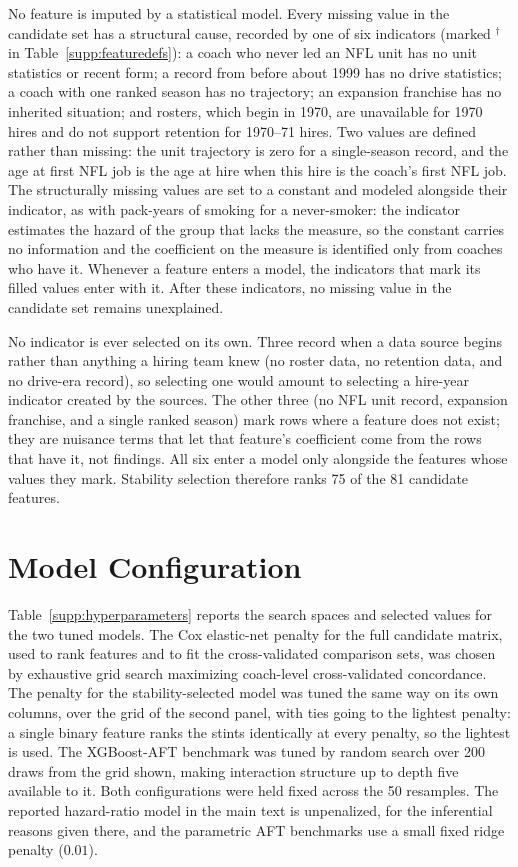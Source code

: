 \documentclass[12pt,USenglish]{article}
\begin{document}
No feature is imputed by a statistical model. Every missing value in the candidate set has a
structural cause, recorded by one of six indicators (marked $^{\dagger}$ in
Table~\ref{supp:featuredefs}): a coach who never led an NFL unit has no unit statistics or
recent form; a record from before about 1999 has no drive statistics; a coach with one ranked
season has no trajectory; an expansion franchise has no inherited situation; and rosters,
which begin in 1970, are unavailable for 1970 hires and do not support retention for 1970--71
hires. Two values are defined rather than missing: the unit trajectory is zero for a
single-season record, and the age at first NFL job is the age at hire when this hire is the
coach's first NFL job. The structurally missing values are set to a constant and modeled
alongside their indicator, as with pack-years of smoking for a never-smoker: the indicator
estimates the hazard of the group that lacks the measure, so the constant carries no
information and the coefficient on the measure is identified only from coaches who have it.
Whenever a feature enters a model, the indicators that mark its filled values enter with it.
After these indicators, no missing value in the candidate set remains unexplained.

No indicator is ever selected on its own. Three record when a data source begins rather
than anything a hiring team knew (no roster data, no retention data, and no drive-era
record), so selecting one would amount to selecting a hire-year indicator created by the
sources. The other three (no NFL unit record, expansion franchise, and a single ranked
season) mark rows where a feature does not exist; they are nuisance terms that let that
feature's coefficient come from the rows that have it, not findings. All six enter a model
only alongside the features whose values they mark. Stability selection therefore ranks 75
of the 81 candidate features.

\section{Model Configuration}
\label{sec:supp_config}

Table~\ref{supp:hyperparameters} reports the search spaces and selected values for the two tuned models. The Cox elastic-net penalty for the full candidate matrix, used to rank features and to fit the cross-validated comparison sets, was chosen by exhaustive grid search maximizing coach-level cross-validated concordance. The penalty for the stability-selected model was tuned the same way on its own columns, over the grid of the second panel, with ties going to the lightest penalty: a single binary feature ranks the stints identically at every penalty, so the lightest is used. The XGBoost-AFT benchmark was tuned by random search over 200 draws from the grid shown, making interaction structure up to depth five available to it. Both configurations were held fixed across the 50 resamples. The reported hazard-ratio model in the main text is unpenalized, for the inferential reasons given there, and the parametric AFT benchmarks use a small fixed ridge penalty ($0.01$).
\end{document}
